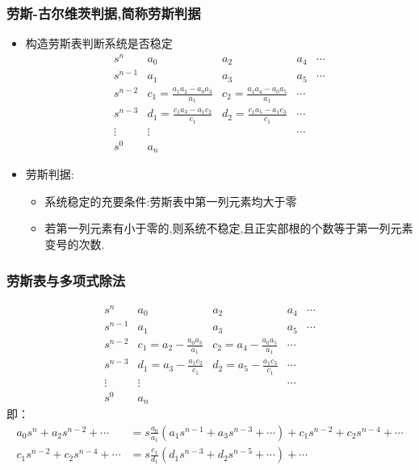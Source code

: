 \documentclass{beamer}
\begin{document}
\begin{frame}
\frametitle{劳斯-古尔维茨判据,简称劳斯判据}
\label{sec-2-3}

\begin{itemize}
\item <2->构造劳斯表判断系统是否稳定
     \begin{equation*}
     \begin{matrix}
     s^{n}   &  a_{0}  &  a_{2}  & a_{4}  & \cdots  \\
     s^{n-1} &  a_{1}  & a_{3}   & a_{5}  & \cdots  \\
     s^{n-2} &  c_{1}=\frac{a_1 a_2 - a_0 a_3}{a_1} &  c_{2}=\frac{a_1 a_4 - a_0 a_5}{a_1} & \cdots \\
     s^{n-3} &  d_{1}=\frac{c_1 a_3 - a_1 c_2}{c_1} &  d_{2}=\frac{c_1 a_5 - a_1 c_3}{c_1} & \cdots \\
     \vdots  &   \vdots                             &                                      & \cdots  \\
     s^{0}   &   a_{n}                              &                                      &
     \end{matrix}
     \end{equation*}
\item <3->劳斯判据:
\begin{itemize}
\item <4->系统稳定的充要条件:劳斯表中第一列元素均大于零
\item <5->若第一列元素有小于零的,则系统不稳定,且正实部根的个数等于第一列元素变号的次数.
\end{itemize}
\end{itemize}
\end{frame}
\begin{frame}
\frametitle{劳斯表与多项式除法}
\label{sec-2-4}

\begin{equation*}
     \begin{matrix}
     s^{n}   &  a_{0}  &  a_{2}  & a_{4}  & \cdots  \\
     s^{n-1} &  a_{1}  & a_{3}   & a_{5}  & \cdots  \\
     s^{n-2} &  c_{1}=a_2 -\frac{ a_0 a_3}{a_1} &  c_{2}=a_4 - \frac{a_0 a_5}{a_1} & \cdots \\
     s^{n-3} &  d_{1}=a_3 -\frac{ a_1 c_2}{c_1} &  d_{2}=a_5 -\frac{ a_1 c_3}{c_1} & \cdots \\
     \vdots  &   \vdots                             &                                      & \cdots  \\
     s^{0}   &   a_{n}                              &                                      &
     \end{matrix}
\end{equation*}
即：
\begin{align*}
    a_0 s^n+a_2 s^{n-2}+\cdots &= s \frac{a_0}{a_1}(a_1 s^{n-1}+a_3 s^{n-3}+\cdots)+c_1 s^{n-2}+c_2 s^{n-4}+\cdots\\
    c_1 s^{n-2}+c_2 s^{n-4}+\cdots &=s \frac{c_1}{d_1}(d_1 s^{n-3}+d_2 s^{n-5}+\cdots)+\cdots
\end{align*}
\end{frame}
\end{document}
